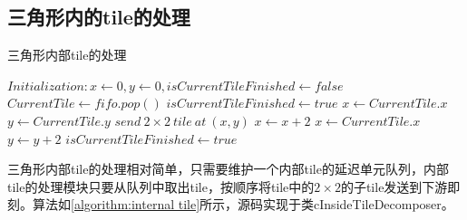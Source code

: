 \subsection{三角形内的tile的处理}
\label{subsection:internal tile}
\begin{algorithm} [H]
	\caption{三角形内部tile的处理} 
	\label{algorithm:internal tile} 
	\begin{algorithmic}
        \STATE $Initialization:x \gets 0,y \gets 0,isCurrentTileFinished \gets false$
            \STATE $CurrentTile \gets fifo.pop()$
            \STATE $isCurrentTileFinished \gets true$
            \STATE $x \gets CurrentTile.x$
            \STATE $y \gets CurrentTile.y$
                \STATE $send \ 2\times 2 \ tile \  at \ (x,y)$
                \STATE $x \gets x+2$
                   \STATE $x \gets CurrentTile.x$
                   \STATE $y \gets y+2$
                        \STATE $isCurrentTileFinished \gets true$
                    \ENDIF
                \ENDIF
            \ENDWHILE
        \ENDWHILE
	\end{algorithmic} 
\end{algorithm}
三角形内部tile的处理相对简单，只需要维护一个内部tile的延迟单元队列，内部tile的处理模块只要从队列中取出tile，按顺序将tile中的$2\times 2$的子tile发送到下游即刻。算法如\ref{algorithm:internal tile}所示，源码实现于类cInsideTileDecomposer。



